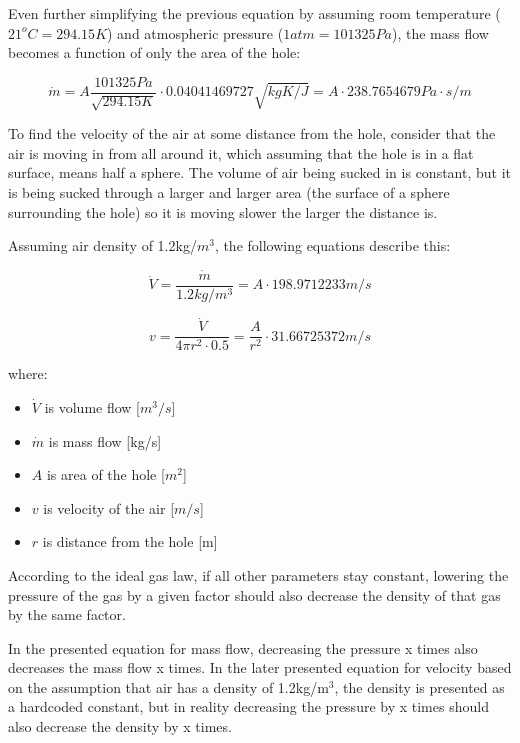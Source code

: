 \documentclass[a4paper]{article}
\begin{document}
	\medskip
	
	Even further simplifying the previous equation by assuming room temperature ($21^oC = 294.15K$) and atmospheric pressure ($1atm = 101325Pa$), the mass flow becomes a function of only the area of the hole:
	
	$$ \dot{m} = A \frac{101325Pa}{\sqrt{294.15K}} \cdot 0.04041469727\sqrt{kgK/J} = A \cdot 238.7654679 Pa \cdot s/m $$
	
	To find the velocity of the air at some distance from the hole, consider that the air is moving in from all around it, which assuming that the hole is in a flat surface, means half a sphere. The volume of air being sucked in is constant, but it is being sucked through a larger and larger area (the surface of a sphere surrounding the hole) so it is moving slower the larger the distance is.
	
	\medskip
	
	Assuming air density of 1.2kg/$m^3$, the following equations describe this:
	
	$$ \dot{V} = \frac{\dot{m}}{1.2kg/m^3} = A \cdot 198.9712233m/s $$
	
	$$ v = \frac{\dot{V}}{4\pi r^2 \cdot 0.5 } = \frac{A}{r^2} \cdot 31.66725372m/s$$
	
	where:
	
	\begin{itemize}
		\item $\dot{V}$ is volume flow [$m^3/s$]
		
		\item $\dot{m}$ is mass flow [kg/s]
		
		\item $A$ is area of the hole [$m^2$]
		
		\item $v$ is velocity of the air [$m/s$]
		
		\item $r$ is distance from the hole [m]
	\end{itemize}
	
	According to the ideal gas law, if all other parameters stay constant, lowering the pressure of the gas by a given factor should also decrease the density of that gas by the same factor.
	
	\medskip
	
	In the presented equation for mass flow, decreasing the pressure x times also decreases the mass flow x times. In the later presented equation for velocity based on the assumption that air has a density of 1.2kg/m$^3$, the density is presented as a hardcoded constant, but in reality decreasing the pressure by x times should also decrease the density by x times.
	
\end{document}
